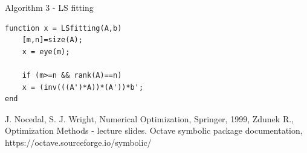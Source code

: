 \documentclass[eng,openany]{mgr}
\begin{document}
Algorithm 3 - LS fitting\\
\begin{lstlisting}
function x = LSfitting(A,b)
	[m,n]=size(A);
	x = eye(m);

	if (m>=n && rank(A)==n)
	x = (inv(((A')*A))*(A'))*b';
end

\end{lstlisting}
\begin{thebibliography}{8}
J. Nocedal, S. J. Wright, Numerical Optimization, Springer, 1999,
Zdunek R., Optimization Methods - lecture slides.
Octave symbolic package documentation, https://octave.sourceforge.io/symbolic/

\end{thebibliography}
\end{document}
